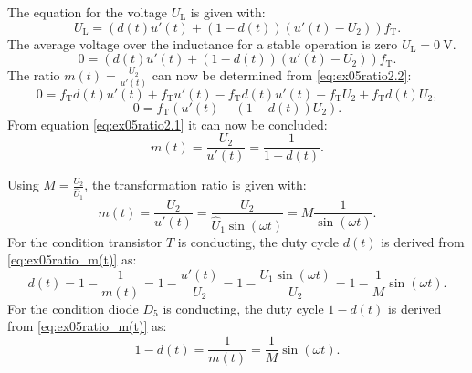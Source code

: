 \begin{solutionblock}
    The equation for the voltage $U_{\mathrm{L}}$ is given with:
    \begin{equation}
        U_{\mathrm{L}} = (d(t) u'(t) + (1-d(t))(u'(t)-U_{\mathrm{2}}))f_\mathrm{T}. 
    \end{equation}
The average voltage over the inductance for a stable operation is zero $U_{\mathrm{L}} = \SI{0}{\volt}$. 
    \begin{equation}
    0 = (d(t) u'(t) + (1-d(t))(u'(t)-U_{\mathrm{2}}))f_\mathrm{T}. \label{eq:ex05ratio2.2}
    \end{equation}   
The ratio $m(t)= \frac{U_\mathrm{2}}{u'(t)}$ can now be determined from \eqref{eq:ex05ratio2.2}: 
  \begin{equation}
    0 = f_\mathrm{T}d(t)u'(t)+f_\mathrm{T}u'(t)- f_\mathrm{T}d(t)u'(t)- f_\mathrm{T}U_{\mathrm{2}}+ f_\mathrm{T}d(t)U_{\mathrm{2}},
  \end{equation}
  \begin{equation}
    0 = f_\mathrm{T}(u'(t)-(1-d(t))U_{\mathrm{2}}).\label{eq:ex05ratio2.1}
  \end{equation}
  From equation \eqref{eq:ex05ratio2.1} it can now be concluded:
  \begin{equation}
    m(t) = \frac{U_{\mathrm{2}}}{u'(t)}=\frac{1}{1-d(t)}. \label{eq:ex05ratio_m(t)}
  \end{equation}
\end{solutionblock}

\begin{solutionblock}
    Using $M = \frac{U_{\mathrm{2}}}{\hat U_{\mathrm{1}}}$, the transformation ratio is given with:
    \begin{equation}
        m(t) = \frac{U_{\mathrm{2}}}{u'(t)}=\frac{U_{\mathrm{2}}}{\hat U_{\mathrm{1}} \sin(\omega t)} = M \frac{1}{\sin(\omega t)}.
    \end{equation}
    For the condition transistor $T$ is conducting, the duty cycle $d(t)$ is derived from \eqref{eq:ex05ratio_m(t)} as:
\begin{equation}
    d(t) = 1-\frac{1}{m(t)} = 1- \frac{u'(t)}{U_{\mathrm{2}}}=1- \frac{U_{\mathrm{1}}\sin(\omega t)}{U_{\mathrm{2}}} = 1 -\frac{1}{M} \sin(\omega t).
\end{equation}
For the condition diode $D_{\mathrm{5}}$ is conducting, the duty cycle $1-d(t)$ is derived from \eqref{eq:ex05ratio_m(t)} as:
\begin{equation}
    1-d(t) = \frac{1}{m(t)}=\frac{1}{M} \sin(\omega t).
\end{equation}
\end{solutionblock}

